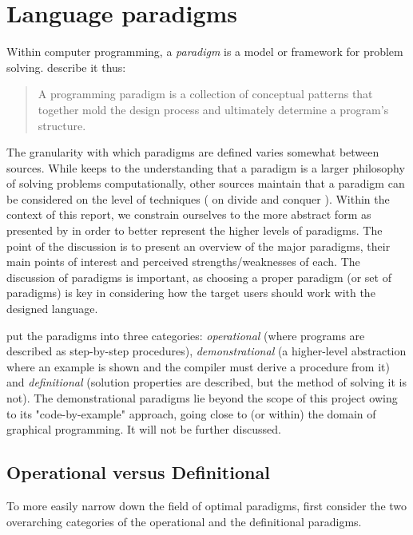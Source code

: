 \section{Language paradigms}
Within computer programming, a \emph{paradigm} is a model or framework for problem solving. \citeauthor{paradigms1992} describe it thus:

\begin{quote}
A programming paradigm is a collection of conceptual patterns that together mold the design process and ultimately determine a program's structure.
\end{quote}

The granularity with which paradigms are defined varies somewhat between sources. While \citeauthor{paradigms1992} keeps to the understanding that a paradigm is a larger philosophy of solving problems computationally, other sources maintain that a paradigm can be considered on the level of techniques (\citeauthor{paradigms1978} on divide and conquer \cite{paradigms1978}). Within the context of this report, we constrain ourselves to the more abstract form as presented by \citeauthor{paradigms1992} in order to better represent the higher levels of paradigms. The point of the discussion is to present an overview of the major paradigms, their main points of interest and perceived strengths/weaknesses of each. The discussion of paradigms is important, as choosing a proper paradigm (or set of paradigms) is key in considering how the target users should work with the designed language.

\citep{paradigms1992} put the paradigms into three categories: \emph{operational} (where programs are described as step-by-step procedures), \emph{demonstrational} (a higher-level abstraction where an example is shown and the compiler must derive a procedure from it) and \emph{definitional} (solution properties are described, but the method of solving it is not). The demonstrational paradigms lie beyond the scope of this project owing to its "code-by-example" approach, going close to (or within) the domain of graphical programming. It will not be further discussed.

\subsection{Operational versus Definitional}
To more easily narrow down the field of optimal paradigms, first consider the two overarching categories of the operational and the definitional paradigms.

